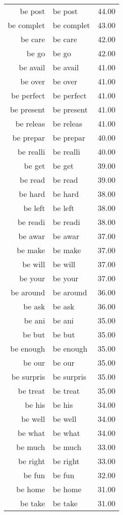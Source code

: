 \begin{table}[ht]
\begin{tabular}{rlr}
  be post & be post & 44.00 \\ 
  be complet & be complet & 43.00 \\ 
  be care & be care & 42.00 \\ 
  be go & be go & 42.00 \\ 
  be avail & be avail & 41.00 \\ 
  be over & be over & 41.00 \\ 
  be perfect & be perfect & 41.00 \\ 
  be present & be present & 41.00 \\ 
  be releas & be releas & 41.00 \\ 
  be prepar & be prepar & 40.00 \\ 
  be realli & be realli & 40.00 \\ 
  be get & be get & 39.00 \\ 
  be read & be read & 39.00 \\ 
  be hard & be hard & 38.00 \\ 
  be left & be left & 38.00 \\ 
  be readi & be readi & 38.00 \\ 
  be awar & be awar & 37.00 \\ 
  be make & be make & 37.00 \\ 
  be will & be will & 37.00 \\ 
  be your & be your & 37.00 \\ 
  be around & be around & 36.00 \\ 
  be ask & be ask & 36.00 \\ 
  be ani & be ani & 35.00 \\ 
  be but & be but & 35.00 \\ 
  be enough & be enough & 35.00 \\ 
  be our & be our & 35.00 \\ 
  be surpris & be surpris & 35.00 \\ 
  be treat & be treat & 35.00 \\ 
  be his & be his & 34.00 \\ 
  be well & be well & 34.00 \\ 
  be what & be what & 34.00 \\ 
  be much & be much & 33.00 \\ 
  be right & be right & 33.00 \\ 
  be fun & be fun & 32.00 \\ 
  be home & be home & 31.00 \\ 
  be take & be take & 31.00 \\ 

\end{tabular}
\end{table}
